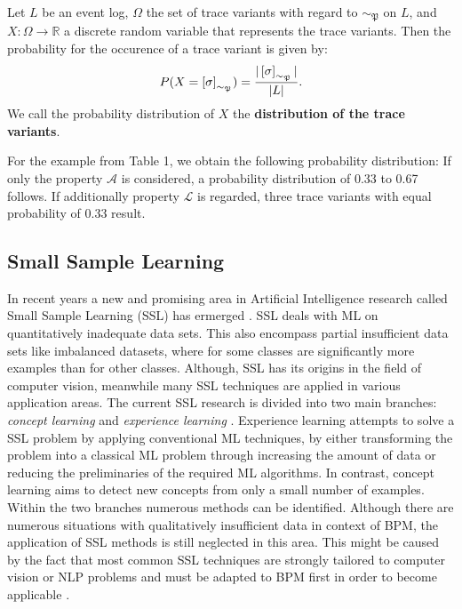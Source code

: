 \documentclass[runningheads]{llncs}
\begin{document}
\begin{definition}
	Let $L$ be an event log, $\Omega$ the set of trace variants with regard to $\sim_{\mathfrak{P}}$ on $L$, and $X: \Omega \rightarrow \mathbb{R}$ a discrete random variable that represents the trace variants. Then the probability for the occurence of a trace variant is given by: 
	\vspace{-7pt}
	\begin{equation*}
	P(X = \left[\sigma\right]_{\sim_{\mathfrak{P}}}) = \frac{\vert \left[\sigma\right]_{\sim_{\mathfrak{P}}} \vert}{\vert L \vert}.\vspace{-8pt}
	\end{equation*}
	We call the probability distribution of $X$ the \textbf{distribution of the trace variants}.
\end{definition}
For the example from Table 1, we obtain the following probability distribution: If only the property $\mathcal{A}$ is considered, a probability distribution of 0.33 to 0.67 follows. If additionally property $\mathcal{L}$ is regarded, three trace variants with equal probability of 0.33 result.
\vspace{-5pt}
\subsection{Small Sample Learning}\label{SubSec:Small-Sample-Learning}
\vspace{-5pt}
In recent years a new and promising area in Artificial Intelligence research called Small Sample Learning (SSL) has ermerged \cite{Shu2018}. SSL deals with ML on quantitatively inadequate data sets. This also encompass partial insufficient data sets like imbalanced datasets, where for some classes are significantly more examples than for other classes. Although, SSL has its origins in the field of computer vision, meanwhile many SSL techniques are applied in various application areas. The current SSL research is divided into two main branches: \textit{concept learning} and \textit{experience learning} \cite{Shu2018}. Experience learning attempts to solve a SSL problem by applying conventional ML techniques, by either transforming the problem into a classical ML problem through increasing the amount of data or reducing the preliminaries of the required ML algorithms. In contrast, concept learning aims to detect new concepts from only a small number of examples. Within the two branches numerous methods can be identified. Although there are numerous situations with qualitatively insufficient data in context of BPM, the application of SSL methods is still neglected in this area. This might be caused by the fact that most common SSL techniques are strongly tailored to computer vision or NLP problems and must be adapted to BPM first in order to become applicable \cite{Kaeppel2020SSL}.
\vspace{-5pt}
\end{document}
